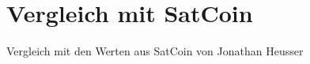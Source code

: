 \chapter{Vergleich mit SatCoin}
\label{chp:comparison}

Vergleich mit den Werten aus SatCoin \cite{jona:1} von Jonathan Heusser

